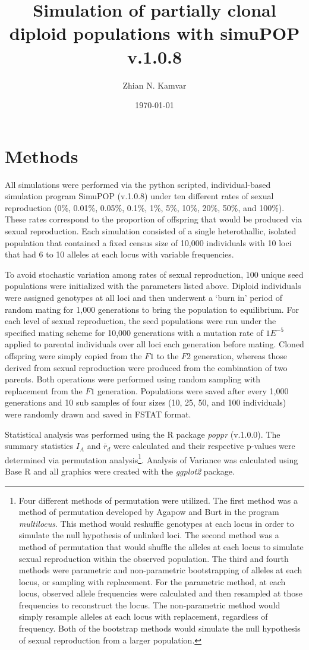\documentclass[letterpaper, 10pt]{article}
\title{Simulation of partially clonal diploid populations with simuPOP v.1.0.8}
\author{Zhian N. Kamvar}
\date{\today}
\newcommand{\tab}{\hspace*{1.5em}}
\begin{document}
\maketitle
\linenumbers
{}
\section{Methods}
\tab All simulations were performed via the python scripted, individual-based simulation program SimuPOP (v.1.0.8) under ten different rates of sexual reproduction (0\%, 0.01\%, 0.05\%, 0.1\%, 1\%, 5\%, 10\%, 20\%, 50\%, and 100\%).
These rates correspond to the proportion of offspring that would be produced via sexual reproduction. 
Each simulation consisted of a single heterothallic, isolated population that contained a fixed census size of 10,000 individuals with 10 loci that had 6 to 10 alleles at each locus with variable frequencies. 

To avoid stochastic variation among rates of sexual reproduction, 100 unique seed populations were initialized with the parameters listed above.
Diploid individuals were assigned genotypes at all loci and then underwent a `burn in' period of random mating for 1,000 generations to bring the population to equilibrium. 
For each level of sexual reproduction, the seed populations were run under the specified mating scheme for 10,000 generations with a mutation rate of $1E^{-5}$ applied to parental individuals over all loci each generation before mating. 
Cloned offspring were simply copied from the $F1$ to the $F2$ generation, whereas those derived from sexual reproduction were produced from the combination of two parents. 
Both operations were performed using random sampling with replacement from the $F1$ generation.
Populations were saved after every 1,000 generations and 10 sub samples of four sizes (10, 25, 50, and 100 individuals) were randomly drawn and saved in FSTAT format. 

Statistical analysis was performed using the R package \textit{poppr} (v.1.0.0). 
The summary statistics $I_A$ and $\bar{r}_d$ were calculated and their respective p-values were determined via permutation analysis\footnote{
Four different methods of permutation were utilized.
The first method was a method of permutation developed by Agapow and Burt in the program \textit{multilocus}.
This method would reshuffle genotypes at each locus in order to simulate the null hypothesis of unlinked loci. 
The second method was a method of permutation that would shuffle the alleles at each locus to simulate sexual reproduction within the observed population.
The third and fourth methods were parametric and non-parametric bootstrapping of alleles at each locus, or sampling with replacement. 
For the parametric method, at each locus, observed allele frequencies were calculated and then resampled at those frequencies to reconstruct the locus. 
The non-parametric method would simply resample alleles at each locus with replacement, regardless of frequency.
Both of the bootstrap methods would simulate the null hypothesis of sexual reproduction from a larger population.}.
Analysis of Variance was calculated using Base R and all graphics were created with the \textit{ggplot2} package.
\end{document}
